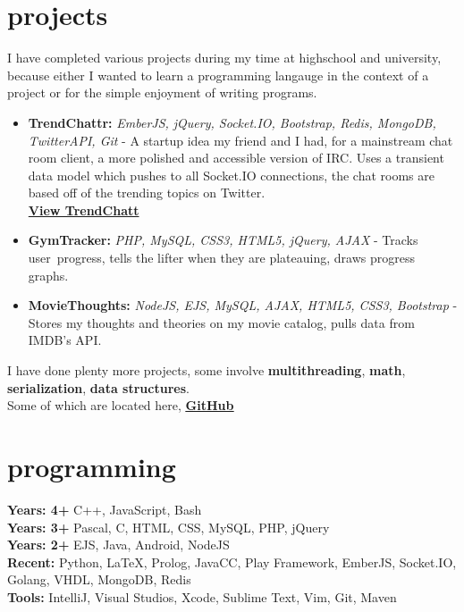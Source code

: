 \documentclass[]{friggeri-cv} %
\begin{document}
\section{projects}
I have completed various projects during my time at highschool and university, because either I wanted to learn a programming langauge
in the context of a project or for the simple enjoyment of writing programs.
\begin{itemize}
    \item \textbf{TrendChattr:} \emph{EmberJS, jQuery, Socket.IO, Bootstrap, Redis, MongoDB, TwitterAPI, Git} -
        A startup idea my friend and I had, for a mainstream chat room client, a more polished and accessible version of IRC. Uses a transient data model which pushes
        to all Socket.IO connections, the chat rooms are based off of the trending topics on Twitter. \\
        {\footnotesize \textbf{\href{http://chat.trendchattr.com/\#/rooms}{View TrendChatt}}}

    \item \textbf{GymTracker:} \emph{PHP, MySQL, CSS3, HTML5, jQuery, AJAX} -
        Tracks user progress, tells the lifter when they are plateauing, draws progress graphs.

    \item \textbf{MovieThoughts:} \emph{NodeJS, EJS, MySQL, AJAX, HTML5, CSS3, Bootstrap} -
        Stores my thoughts and theories on my movie catalog, pulls data from IMDB's API.
\end{itemize}
I have done plenty more projects, some involve \textbf{multithreading}, \textbf{math}, \textbf{serialization}, \textbf{data structures}. \\
Some of which are located here, \underline{\textbf{\href{http://github.com/Compulsed/}{GitHub}}}




\section{programming}
    \textbf{Years: 4+} C++, JavaScript, Bash \\
    \textbf{Years: 3+} Pascal, C, HTML, CSS, MySQL, PHP, jQuery \\
    \textbf{Years: 2+} EJS, Java, Android, NodeJS \\
    \textbf{Recent:}  Python, LaTeX, Prolog, JavaCC, Play Framework, EmberJS, Socket.IO, Golang, VHDL, MongoDB, Redis\\
    \textbf{Tools:} IntelliJ, Visual Studios, Xcode, Sublime Text, Vim, Git, Maven
\end{document}

